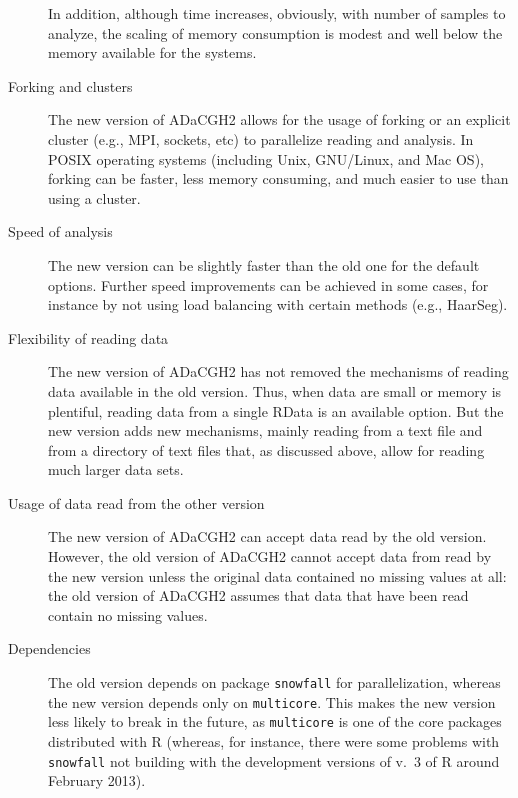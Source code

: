 \documentclass[a4paper,11pt]{article}
\begin{document}
\begin{description}
 In addition, although time increases, obviously, with number of samples
  to analyze, the scaling of memory consumption is modest and well below
  the memory available for the systems.

\item[Forking and clusters] The new version of ADaCGH2 allows for the
  usage of forking or an explicit cluster (e.g., MPI, sockets, etc) to
  parallelize reading and analysis. In POSIX operating systems (including
  Unix, GNU/Linux, and Mac OS), forking can be faster, less memory
  consuming, and much easier to use than using a cluster.


\item[Speed of analysis] The new version can be slightly faster than the
  old one for the default options. Further speed improvements can be
  achieved in some cases, for instance by not using load balancing with
  certain methods (e.g., HaarSeg).

\item[Flexibility of reading data] The new version of ADaCGH2 has not
  removed the mechanisms of reading data available in the old
  version. Thus, when data are small or memory is plentiful, reading data
  from a single RData is an available option. But the new version adds new
  mechanisms, mainly reading from a text file and from a directory of text
  files that, as discussed above, allow for reading much larger data sets.

\item[Usage of data read from the other version] The new version of
  ADaCGH2 can accept data read by the old version. However, the old
  version of ADaCGH2 cannot accept data from read by the new version
  unless the original data contained no missing values at all: the old
  version of ADaCGH2 assumes that data that have been read contain no
  missing values.



\item[Dependencies] The old version depends on package \texttt{snowfall}
  for parallelization, whereas the new version depends only on
  \texttt{multicore}. This makes the new version less likely to break in
  the future, as \texttt{multicore} is one of the core packages
  distributed with R (whereas, for instance, there were some problems with
  \texttt{snowfall} not building with the development versions of v.\ 3 of
  R around February 2013).




\end{description}
\end{document}
